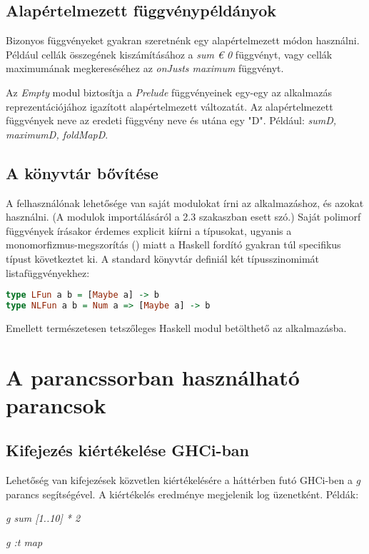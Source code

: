 \subsection{Alapértelmezett függvénypéldányok}

Bizonyos függvényeket gyakran szeretnénk egy alapértelmezett módon használni. Például cellák összegének kiszámításához a \textit{sum € 0} függvényt, vagy cellák maximumának megkereséséhez az \textit{onJusts maximum} függvényt.

Az \textit{Empty} modul biztosítja a \textit{Prelude} függvényeinek egy-egy az alkalmazás reprezentációjához igazított alapértelmezett változatát. Az alapértelmezett függvények neve az eredeti függvény neve és utána egy "D". Például: \textit{sumD, maximumD, foldMapD}.

\subsection{A könyvtár bővítése}

A felhasználónak lehetősége van saját modulokat írni az alkalmazáshoz, és azokat használni. (A modulok importálásáról a 2.3 szakaszban esett szó.) Saját polimorf függvények írásakor érdemes explicit kiírni a típusokat, ugyanis a monomorfizmus-megszorítás (\cite{monorestr}) miatt a Haskell fordító gyakran túl specifikus típust következtet ki. A standard könyvtár definiál két típusszinomimát listafüggvényekhez:

\begin{lstlisting}[caption={LFun és NLFun}, language={Haskell},label=src:lfun]
type LFun a b = [Maybe a] -> b
type NLFun a b = Num a => [Maybe a] -> b
\end{lstlisting}

Emellett természetesen tetszőleges Haskell modul betölthető az alkalmazásba.

\section{A parancssorban használható parancsok}

\subsection{Kifejezés kiértékelése GHCi-ban}

Lehetőség van kifejezések közvetlen kiértékelésére a háttérben futó GHCi-ben a \textit{g} parancs segítségével. A kiértékelés eredménye megjelenik log üzenetként. Példák:
\begin{compactenum}
	\item \textit{g sum [1..10] * 2}
	\item \textit{g :t map}
\end{compactenum}


